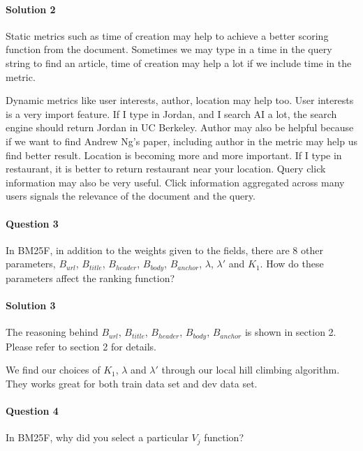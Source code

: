 \documentclass{article}
\begin{document}
\vspace{-3mm}
\paragraph{Solution 2}
Static metrics such as time of creation may help to achieve a better scoring function from the document. Sometimes we may type in a time in the query string to find an article, time of creation may help a lot if we include time in the metric.

Dynamic metrics like user interests, author, location may help too. User interests is a very import feature. If I type in Jordan, and I search AI a lot, the search engine should return Jordan in UC Berkeley. Author may also be helpful because if we want to find Andrew Ng's paper, including author in the metric may help us find better result. Location is becoming more and more important. If I type in restaurant, it is better to return restaurant near your location. Query click information may also be very useful. Click information aggregated across many users signals the relevance of the document and the query.

\paragraph{Question 3}
In BM25F, in addition to the weights given to the fields, there are 8 other parameters, $B_{url}$, $B_{title}$, $B_{header}$, $B_{body}$, $B_{anchor}$, $\lambda$, $\lambda'$ and $K_1$. How do these parameters affect the ranking function?

\vspace{-3mm}
\paragraph{Solution 3}
The reasoning behind $B_{url}$, $B_{title}$, $B_{header}$, $B_{body}$, $B_{anchor}$ is shown in section 2. Please refer to section 2 for details.

We find our choices of $K_1$, $\lambda$ and $\lambda'$ through our local hill climbing algorithm. They works great for both train data set and dev data set.

\paragraph{Question 4}
In BM25F, why did you select a particular $V_j$ function?

\vspace{-3mm}
\end{document}
